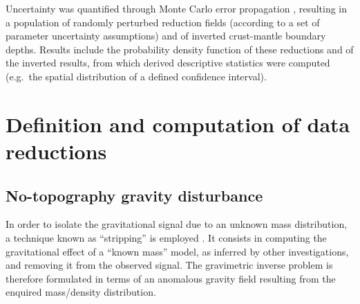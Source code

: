Uncertainty was quantified through Monte Carlo error propagation \parencite{Aster2018}, resulting in a population of randomly perturbed reduction fields (according to a set of parameter uncertainty assumptions) and of inverted crust-mantle boundary depths.
Results include the probability density function of these reductions and of the inverted results, from which derived descriptive statistics were computed (e.g.~the spatial distribution of a defined confidence interval).


\section{Definition and computation of data reductions}
\label{s:SigIs:Defs}

\subsection{No-topography gravity disturbance}
\label{ss:SigIs:Defs:NETC}
In order to isolate the gravitational signal due to an unknown mass distribution, a technique known as ``stripping'' is employed \parencites{Vajda2008}{Tenzer2009}.
It consists in computing the gravitational effect of a ``known mass'' model, as inferred by other investigations, and removing it from the observed signal.
The gravimetric inverse problem is therefore formulated in terms of an anomalous gravity field resulting from the enquired mass/density distribution.

